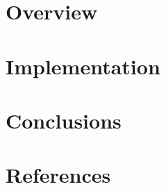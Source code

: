 \section[Overview]{Overview}


% 
% 

\section[Impl]{Implementation}


\section[Concl]{Conclusions}


\section[Refs]{References}
